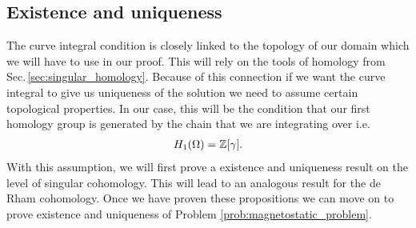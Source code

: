 \documentclass[../main.tex]{subfiles}
\begin{document}
\subsection{Existence and uniqueness}

The curve integral condition is closely linked to the topology of our domain 
which we will have to use in our proof.
This will rely on the tools of homology from Sec.\,\ref{sec:singular_homology}. 
Because of this connection if we want the curve integral
to give us uniqueness of the solution we need to assume certain topological 
properties. In our case, this will be the condition that our first 
homology group is generated by the chain that we are integrating over i.e.
\begin{align*}
    H_1(\Omega) = \mathbb{Z} [\gamma].
\end{align*}
With this assumption, we will first prove a existence and uniqueness result on the 
level of singular cohomology. This will lead to an analogous result for the de Rham 
cohomology. Once we have proven these propositions we can move on to prove existence 
and uniqueness of Problem \ref{prob:magnetostatic_problem}.
\end{document}
